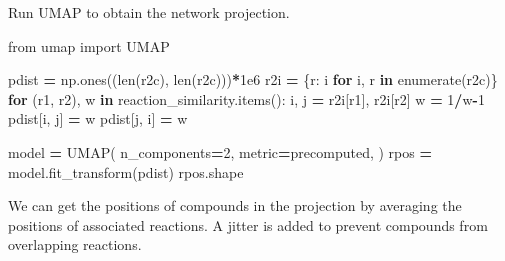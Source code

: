 \documentclass[
]{book}
\newenvironment{Shaded}{\begin{snugshade}}{\end{snugshade}}
\newcommand{\BuiltInTok}[1]{#1}
\newcommand{\ControlFlowTok}[1]{\textcolor[rgb]{0.13,0.29,0.53}{\textbf{#1}}}
\newcommand{\DecValTok}[1]{\textcolor[rgb]{0.00,0.00,0.81}{#1}}
\newcommand{\FloatTok}[1]{\textcolor[rgb]{0.00,0.00,0.81}{#1}}
\newcommand{\ImportTok}[1]{#1}
\newcommand{\KeywordTok}[1]{\textcolor[rgb]{0.13,0.29,0.53}{\textbf{#1}}}
\newcommand{\NormalTok}[1]{#1}
\newcommand{\OperatorTok}[1]{\textcolor[rgb]{0.81,0.36,0.00}{\textbf{#1}}}
\newcommand{\StringTok}[1]{\textcolor[rgb]{0.31,0.60,0.02}{#1}}
\begin{document}
Run UMAP to obtain the network projection.

\begin{Shaded}
\begin{Highlighting}[numbers=left,,]
\ImportTok{from}\NormalTok{ umap }\ImportTok{import}\NormalTok{ UMAP}

\NormalTok{pdist }\OperatorTok{=}\NormalTok{ np.ones((}\BuiltInTok{len}\NormalTok{(r2c), }\BuiltInTok{len}\NormalTok{(r2c)))}\OperatorTok{*}\FloatTok{1e6}
\NormalTok{r2i }\OperatorTok{=}\NormalTok{ \{r: i }\ControlFlowTok{for}\NormalTok{ i, r }\KeywordTok{in} \BuiltInTok{enumerate}\NormalTok{(r2c)\}}
\ControlFlowTok{for}\NormalTok{ (r1, r2), w }\KeywordTok{in}\NormalTok{ reaction\_similarity.items():}
\NormalTok{    i, j }\OperatorTok{=}\NormalTok{ r2i[r1], r2i[r2]}
\NormalTok{    w }\OperatorTok{=} \DecValTok{1}\OperatorTok{/}\NormalTok{w}\OperatorTok{{-}}\DecValTok{1}
\NormalTok{    pdist[i, j] }\OperatorTok{=}\NormalTok{ w}
\NormalTok{    pdist[j, i] }\OperatorTok{=}\NormalTok{ w}

\NormalTok{model }\OperatorTok{=}\NormalTok{ UMAP(}
\NormalTok{    n\_components}\OperatorTok{=}\DecValTok{2}\NormalTok{, metric}\OperatorTok{=}\StringTok{\textquotesingle{}precomputed\textquotesingle{}}\NormalTok{,}
\NormalTok{)}
\NormalTok{rpos }\OperatorTok{=}\NormalTok{ model.fit\_transform(pdist)}
\NormalTok{rpos.shape}
\end{Highlighting}
\end{Shaded}

We can get the positions of compounds in the projection by averaging the positions of associated reactions.
A jitter is added to prevent compounds from overlapping reactions.
\end{document}
